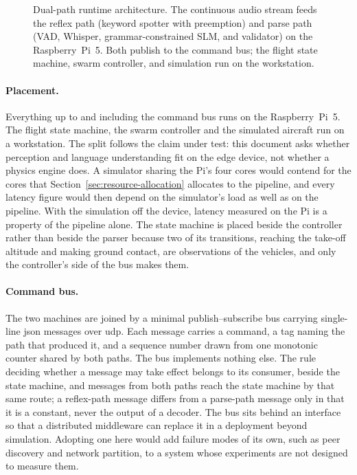\begin{figure}[htbp]
{}
\caption[Dual-path runtime architecture]{Dual-path runtime architecture. The continuous audio stream feeds the reflex path (keyword spotter with preemption) and parse path (VAD, Whisper, grammar-constrained SLM, and validator) on the Raspberry~Pi~5. Both publish to the command bus; the flight state machine, swarm controller, and simulation run on the workstation.}
\label{fig:architecture}
\end{figure}

\paragraph{Placement.} Everything up to and including the command bus runs on the
Raspberry~Pi~5. The flight state machine, the swarm controller and the simulated aircraft run on a
workstation. The split follows the claim under test: this document asks whether perception and
language understanding fit on the edge device, not whether a physics engine does. A simulator
sharing the Pi's four cores would contend for the cores that Section~\ref{sec:resource-allocation}
allocates to the pipeline, and every latency figure would then depend on the simulator's load as
well as on the pipeline. With the simulation off the device, latency measured on the Pi is a
property of the pipeline alone. The state machine is placed beside the controller rather than
beside the parser because two of its transitions, reaching the take-off altitude and making
ground contact, are observations of the vehicles, and only the controller's side of the bus
makes them.

\paragraph{Command bus.} The two machines are joined by a minimal publish--subscribe bus
carrying single-line \gls{json} messages over \gls{udp}. Each message carries a command, a tag naming
the path that produced it, and a sequence number drawn from one monotonic counter shared by both
paths. The bus implements nothing else. The rule deciding whether a message may take effect
belongs to its consumer, beside the state machine, and messages from both paths reach the state
machine by that same route; a reflex-path message differs from a parse-path message only in that
it is a constant, never the output of a decoder. The bus sits behind an interface so that a
distributed middleware can replace it in a deployment beyond simulation. Adopting one here would
add failure modes of its own, such as peer discovery and network partition, to a system whose
experiments are not designed to measure them.

